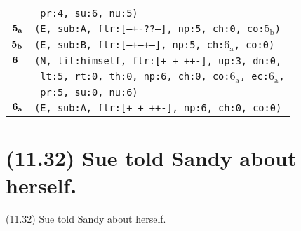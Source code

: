 \documentclass{article}
\begin{document}
\begin{minipage}{\textwidth}
{\begin{tabular}{|r|l|}
    & \texttt{\texttt{~pr:4,~su:6,~nu:5)}} \\
    ${\textbf{\textrm{5}}_{\textbf{\textrm{a}}}}$ & \texttt{\texttt{(E,~sub:A,~ftr:[---+-??--],~np:5,~ch:0,~co:${\textrm{5}_{\textrm{b}}}$)}} \\
    ${\textbf{\textrm{5}}_{\textbf{\textrm{b}}}}$ & \texttt{\texttt{(E,~sub:B,~ftr:[---+--+--],~np:5,~ch:${\textrm{6}_{\textrm{a}}}$,~co:0)}} \\
    ${\textbf{\textrm{6}}_{\phantom{z}}}$ & \texttt{\texttt{(N,~lit:himself,~ftr:[+--+--++-],~up:3,~dn:0,}} \\
    & \texttt{\texttt{~lt:5,~rt:0,~th:0,~np:6,~ch:0,~co:${\textrm{6}_{\textrm{a}}}$,~ec:${\textrm{6}_{\textrm{a}}}$,}} \\
    & \texttt{\texttt{~pr:5,~su:0,~nu:6)}} \\
    ${\textbf{\textrm{6}}_{\textbf{\textrm{a}}}}$ & \texttt{\texttt{(E,~sub:A,~ftr:[+--+--++-],~np:6,~ch:0,~co:0)}} \\
    \hline
  \end{tabular}
  }
\end{minipage}
\bigbreak

\clearpage

%
%

\section*{(11.32) Sue told Sandy about herself.}

\bigbreak
\begin{enumerate*}
\item[(11.32)] Sue told Sandy about herself.
\end{enumerate*}
\bigbreak
\end{document}
